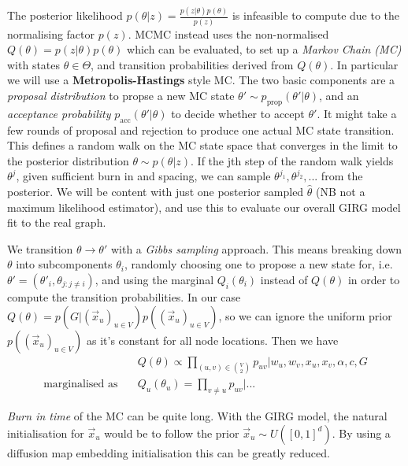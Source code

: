 The posterior likelihood $p(\theta | z) = \frac{p(z | \theta) p(\theta)}{p(z)}$ is infeasible to compute due to the normalising factor $p(z)$. MCMC instead uses the non-normalised $Q(\theta) = p(z | \theta) p(\theta)$ which can be evaluated, to set up a \textit{Markov Chain (MC)} with states $\theta \in \Theta$, and transition probabilities derived from $Q(\theta)$.
In particular we will use a \textbf{Metropolis-Hastings} style MC. The two basic components are a \textit{proposal distribution} to propse a new MC state $\theta' \sim p_{\mathrm{prop}}(\theta' | \theta)$, and an \textit{acceptance probability} $p_{\mathrm{acc}}(\theta' | \theta)$ to decide whether to accept $\theta'$. It might take a few rounds of proposal and rejection to produce one actual MC state transition. This defines  a random walk on the MC state space that converges in the limit to the posterior distribution $\theta \sim p(\theta | z)$. If the jth step of the random walk yields $\theta^j$, given sufficient burn in and spacing, we can sample $\theta^{j_1}, \theta^{j_2}, ...$ from the posterior. We will be content with just one posterior sampled $\hat{\theta}$ (NB not a maximum likelihood estimator), and use this to evaluate our overall GIRG model fit to the real graph.

We transition $\theta \to \theta'$ with a \textit{Gibbs sampling} approach. This means breaking down $\theta$ into subcomponents $\theta_i$, randomly choosing one to propose a new state for, i.e. $\theta' = (\theta'_i, \theta_{j:j \neq i})$, and using the marginal $Q_i(\theta_i)$ instead of $Q(\theta)$ in order to compute the transition probabilities.
In our case $Q(\theta) = p(G | (\vec{x}_u)_{u \in V}) p((\vec{x}_u)_{u \in V})$, so we can ignore the uniform prior $p((\vec{x}_u)_{u \in V})$ as it's constant for all node locations. Then we have 
\begin{align}
  & Q(\theta) \propto \prod_{(u,v) \in {V \choose 2}} p_{uv} | w_u, w_v, x_u, x_v, \alpha, c, G
  \\
  \text{marginalised as} \quad & Q_u(\theta_u) = \prod_{v \neq u} p_{uv} | ...
\end{align}


\textit{Burn in time} of the MC can be quite long. With the GIRG model, the natural initialisation for $\vec{x}_u$ would be to follow the prior $\vec{x}_u \sim U([0, 1]^d)$. By using a diffusion map embedding initialisation this can be greatly reduced.

